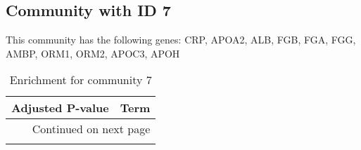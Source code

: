 \subsection*{Community with ID 7}
This community has the following genes: CRP, APOA2, ALB, FGB, FGA, FGG, AMBP, ORM1, ORM2, APOC3, APOH
\\
\begin{longtable}{p{2.4cm}p{14.5cm}}
\caption{Enrichment for community 7}\\
\toprule
Adjusted \newline P-value &                                                                                          Term \\
\midrule
\endhead
\midrule
\multicolumn{2}{r}{{Continued on next page}} \\
\midrule
\endfoot


\end{longtable}
